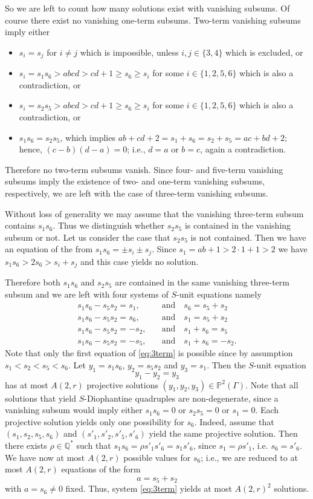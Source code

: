 \documentclass{amsart}
\theoremstyle{remark}
\begin{document}
So we are left to count how many solutions exist with vanishing subsums. Of course there exist no vanishing one-term subsums. Two-term vanishing 
subsums imply either
\begin{itemize}
\item $s_i=s_j$ for $i\neq j$ which is impossible, unless $i,j\in \{3,4\}$ which is excluded, or 
\item $s_i=s_1s_6>abcd>cd+1\geq s_6\geq s_i$ for some $i\in\{1,2,5,6\}$ which is also a contradiction, or
\item $s_i=s_2s_5>abcd>cd+1\geq s_6\geq s_i$ for some $i\in\{1,2,5,6\}$ which is also a contradiction, or
\item $s_1s_6=s_2s_5$, which implies $ab+cd+2=s_1+s_6=s_2+s_5=ac+bd+2$; hence, $(c-b)(d-a)=0$; i.e., $d=a$ or $b=c$, again a contradiction. 
\end{itemize}
Therefore no two-term subsums vanish. Since four- and five-term vanishing subsums imply the existence of two- and one-term vanishing subsums, respectively, we 
are left with the case of three-term vanishing subsums.

Without loss of generality we may assume that the vanishing three-term subsum contains $s_1s_6$. Thus we distinguish whether $s_2s_5$ is contained in the 
vanishing subsum or not. Let us consider the case that $s_2s_5$ is not contained. Then we have an equation of the from $s_1s_6=\pm s_i \pm s_j$. Since 
$s_1=ab+1>2\cdot 1+1>2$ we have $s_1s_6>2s_6>s_i+s_j$ and this case yields no solution.

Therefore both $s_1s_6$ and $s_2s_5$ are contained in the same vanishing three-term subsum and we are left with four systems of $S$-unit equations namely
\begin{equation}\label{eq:3term}
\begin{split}
  s_1s_6-s_5s_2=s_1,& \quad \text{and} \quad s_6=s_5+s_2\\
  s_1s_6-s_5s_2=s_6,& \quad \text{and} \quad s_1=s_5+s_2\\
  s_1s_6-s_5s_2=-s_2,& \quad \text{and} \quad s_1+s_6=s_5\\
  s_1s_6-s_5s_2=-s_5,& \quad \text{and} \quad s_1+s_6=-s_2.
\end{split}
\end{equation}
Note that only the first equation of \eqref{eq:3term} is possible since by assumption $s_1<s_2<s_5<s_6$.
Let $y_1=s_1s_6$, $y_2=s_5s_2$ and $y_3=s_1$. Then the $S$-unit equation 
$$y_1-y_2=y_3$$
has at most $A(2,r)$ projective solutions $(y_1,y_2,y_3)\in{\mathbb {P}}^2(\Gamma)$. Note that all solutions that yield $S$-Diophantine quadruples are non-degenerate, 
since a vanishing subsum would imply either $s_1s_6=0$ or $s_2s_5=0$ or $s_1=0$.
Each projective solution yields only one possibility for $s_6$. Indeed, assume that $(s_1,s_2,s_5,s_6)$ and $(s'_1,s'_2,s'_5,s'_6)$ yield the same projective 
solution. Then there exists $\rho\in{\mathbb{Q}}^*$ such that $s_1s_6=\rho s'_1 s'_6=s_1s'_6$, since $s_1=\rho s'_1$, i.e. $s_6=s'_6$. We have now at most $A(2,r)$ 
possible values  for $s_6$; i.e., we are reduced to at most $A(2,r)$ equations of the form 
$$a=s_5+s_2$$
with $a=s_6\neq 0$ fixed. Thus, system \eqref{eq:3term} yields at most $A(2,r)^2$ solutions.
\end{document}
